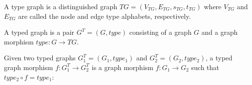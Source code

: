 \begin{definition} A type graph is a distinguished graph $TG = \left(V_{TG},E_{TG},s_{TG},t_{TG}\right)$ where $V_{TG}$ and $E_{TG}$ are called the node and edge type alphabets, respectively.

  A typed graph is a pair $G^T = \left(G, type\right)$ consisting of a graph $G$ and a graph morphism $type : G \rightarrow TG$.

  Given two typed graphs $G^T_1 = \left(G_1,type_1\right)$ and $G^T_2 =\left(G_2,type_2\right)$, a typed graph morphism $f : G^T_1 \rightarrow G^T_2$ is a graph morphism $f : G_1 \rightarrow G_2$ such that $type_2 \circ f = type_1$:

\end{definition}


